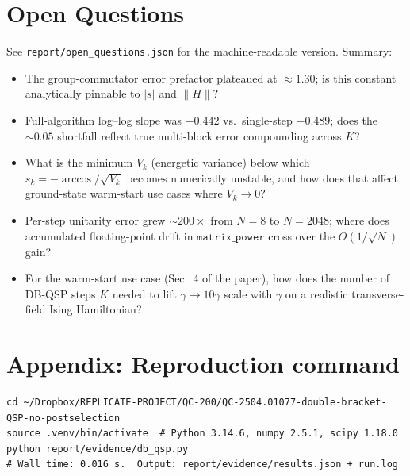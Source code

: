 \documentclass[11pt]{article}
\begin{document}
\section{Open Questions}\label{sec:open}
See \texttt{report/open\_questions.json} for the machine-readable version. Summary:
\begin{itemize}\itemsep2pt
\item[\textbf{Q1}] The group-commutator error prefactor plateaued at $\approx 1.30$; is this constant analytically pinnable to $|s|$ and $\lVert H\rVert$?
\item[\textbf{Q2}] Full-algorithm log--log slope was $-0.442$ vs.\ single-step $-0.489$; does the $\sim 0.05$ shortfall reflect true multi-block error compounding across $K$?
\item[\textbf{Q3}] What is the minimum $V_k$ (energetic variance) below which $s_k = -\arccos/\sqrt{V_k}$ becomes numerically unstable, and how does that affect ground-state warm-start use cases where $V_k \to 0$?
\item[\textbf{Q4}] Per-step unitarity error grew $\sim 200\times$ from $N=8$ to $N=2048$; where does accumulated floating-point drift in $\texttt{matrix\_power}$ cross over the $O(1/\sqrt{N})$ gain?
\item[\textbf{Q5}] For the warm-start use case (Sec.~4 of the paper), how does the number of DB-QSP steps $K$ needed to lift $\gamma\to 10\gamma$ scale with $\gamma$ on a realistic transverse-field Ising Hamiltonian?
\end{itemize}

\section*{Appendix: Reproduction command}
\begin{lstlisting}
cd ~/Dropbox/REPLICATE-PROJECT/QC-200/QC-2504.01077-double-bracket-QSP-no-postselection
source .venv/bin/activate  # Python 3.14.6, numpy 2.5.1, scipy 1.18.0
python report/evidence/db_qsp.py
# Wall time: 0.016 s.  Output: report/evidence/results.json + run.log
\end{lstlisting}
\end{document}
